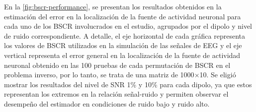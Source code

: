 En la \cref{fig:bscr-performance}, se presentan los resultados obtenidos en la estimación del error en la localización de la fuente de actividad neuronal para cada uno de los BSCR involucrados en el estudio, agrupados por el dipolo y nivel de ruido correspondiente.
A detalle, el eje horizontal de cada gráfica representa los valores de BSCR utilizados en la simulación de las señales de EEG y el eje vertical representa el error general en la localización de la fuente de actividad neuronal obtenido en las 100 pruebas de cada permutación de BSCR en el problema inverso, por lo tanto, se trata de una matriz de 1000$\times$10.
Se eligió mostrar los resultados del nivel de SNR 1\% y 10\% para cada dipolo, ya que estos representan los extremos en la relación señal-ruido y permiten observar el desempeño del estimador en condiciones de ruido bajo y ruido alto.

